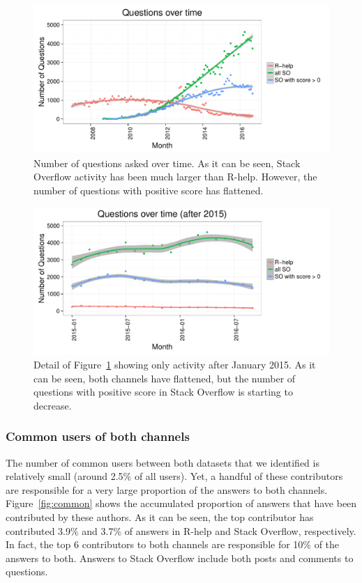 \documentclass[smallextended]{svjour3}       %
\newcommand{\SO}{Stack Overflow\xspace}
\newcommand{\RH}{R-help\xspace}
\begin{document}
\begin{figure}[htbp]
  \centering
  \includegraphics[width=.95\textwidth]{figs/actByMonth.pdf}
  \caption{Number of questions asked over time. As it can be seen, \SO activity has been much larger than \RH. However,
    the number of questions with positive score has flattened.}
  \label{fig:channelsActPerMonth}
\end{figure}


\begin{figure}[htbp]
  \centering
  \includegraphics[width=.95\textwidth]{figs/actByMonth2016.pdf}
  \caption{Detail of Figure~\ref{fig:channelsActPerMonth} showing only activity after January 2015. As it can be seen, both
    channels have flattened, but the number of questions with positive score in \SO is starting to decrease.}
  \label{fig:channelsActPerMonthLatests}
\end{figure}

\subsubsection{Common users of both channels}

The number of common users between both datasets that we identified is relatively small (around 2.5\% of all
users). Yet, a handful of these contributors are responsible for a very large proportion of the answers to both
channels. Figure~\ref{fig:common} shows the accumulated proportion of answers that have been contributed by these
authors. As it can be seen, the top contributor has contributed 3.9\% and 3.7\% of answers in \RH and \SO,
respectively. In fact, the top 6 contributors to both channels are responsible for 10\% of the answers to both. 
Answers to \SO include both posts and comments to questions.
\end{document}
